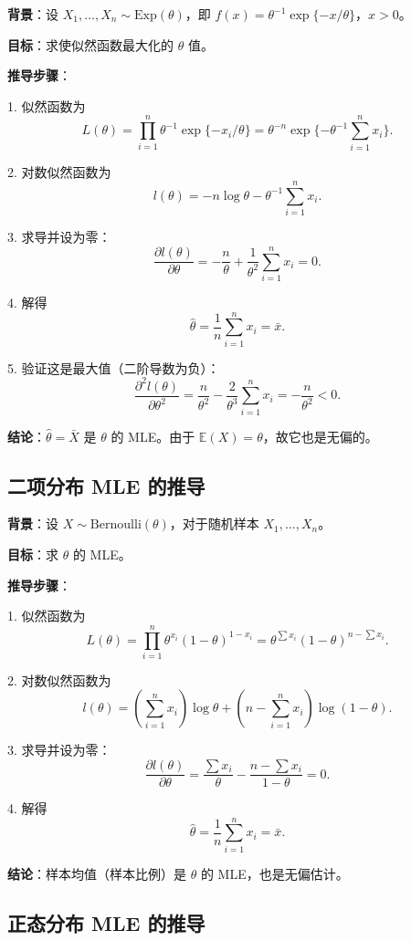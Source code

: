 \textbf{背景}：设 $X_1, \ldots, X_n \sim \mathrm{Exp}(\theta)$，即 $f(x) = \theta^{-1}\exp\{-x/\theta\}$，$x > 0$。

\textbf{目标}：求使似然函数最大化的 $\theta$ 值。

\textbf{推导步骤}：

1. 似然函数为
\[
L(\theta) = \prod_{i=1}^{n} \theta^{-1}\exp\{-x_i/\theta\} = \theta^{-n}\exp\{-\theta^{-1}\sum_{i=1}^{n}x_i\}.
\]

2. 对数似然函数为
\[
l(\theta) = -n\log\theta - \theta^{-1}\sum_{i=1}^{n}x_i.
\]

3. 求导并设为零：
\[
\frac{\partial l(\theta)}{\partial \theta} = -\frac{n}{\theta} + \frac{1}{\theta^2}\sum_{i=1}^{n}x_i = 0.
\]

4. 解得
\[
\widehat{\theta} = \frac{1}{n}\sum_{i=1}^{n}x_i = \bar{x}.
\]

5. 验证这是最大值（二阶导数为负）：
\[
\frac{\partial^2 l(\theta)}{\partial \theta^2} = \frac{n}{\theta^2} - \frac{2}{\theta^3}\sum_{i=1}^{n}x_i = -\frac{n}{\theta^2} < 0.
\]

\textbf{结论}：$\widehat{\theta} = \bar{X}$ 是 $\theta$ 的 MLE。由于 $\mathbb{E}(X) = \theta$，故它也是无偏的。

\subsection{二项分布 MLE 的推导}\label{sec:derivation-binomial-mle}

\textbf{背景}：设 $X \sim \mathrm{Bernoulli}(\theta)$，对于随机样本 $X_1, \ldots, X_n$。

\textbf{目标}：求 $\theta$ 的 MLE。

\textbf{推导步骤}：

1. 似然函数为
\[
L(\theta) = \prod_{i=1}^{n} \theta^{x_i}(1-\theta)^{1-x_i} = \theta^{\sum x_i}(1-\theta)^{n-\sum x_i}.
\]

2. 对数似然函数为
\[
l(\theta) = \left(\sum_{i=1}^{n} x_i\right)\log\theta + \left(n - \sum_{i=1}^{n} x_i\right)\log(1-\theta).
\]

3. 求导并设为零：
\[
\frac{\partial l(\theta)}{\partial \theta} = \frac{\sum x_i}{\theta} - \frac{n - \sum x_i}{1-\theta} = 0.
\]

4. 解得
\[
\widehat{\theta} = \frac{1}{n}\sum_{i=1}^{n} x_i = \bar{x}.
\]

\textbf{结论}：样本均值（样本比例）是 $\theta$ 的 MLE，也是无偏估计。

\subsection{正态分布 MLE 的推导}\label{sec:derivation-normal-mle}

